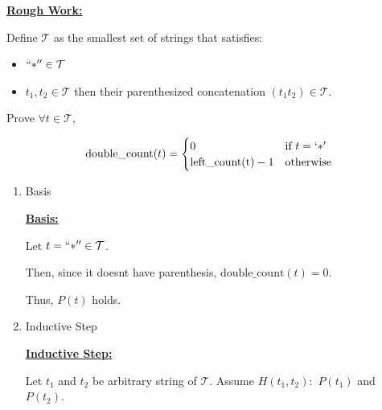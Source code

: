 \documentclass[12pt]{article}
\begin{document}
\begin{enumerate}[a.]
    \begin{mdframed}
    \underline{\textbf{Rough Work:}}

    \bigskip

    Define $\mathcal{T}$ as the smallest set of strings that satisfies:

    \begin{itemize}
        \item $``*'' \in \mathcal{T}$
        \item $t_1, t_2 \in \mathcal{T}$ then their parenthesized concatenation $(t_1t_2) \in \mathcal{T}$.
    \end{itemize}

    \bigskip

    Prove $\forall t \in \mathcal{T}$,

    \begin{align*}
        \text{double\_count}(t) =
        \begin{cases}
        0 & \text{if $t = `*'$}\\
        \text{left\_count(t)} - 1 & \text{otherwise}
        \end{cases}
    \end{align*}

    \begin{enumerate}[1.]
        \item Basis

        \begin{mdframed}
        \underline{\textbf{Basis:}}

        \bigskip

        Let $t = ``*'' \in \mathcal{T}$.

        \bigskip

        Then, since it doesnt have parenthesis, $\text{double\_count}(t) = 0$.

        \bigskip

        Thus, $P(t)$ holds.
        \end{mdframed}

        \item Inductive Step

        \begin{mdframed}
        \underline{\textbf{Inductive Step:}}

        \bigskip

        Let $t_1$ and $t_2$ be arbitrary string of $\mathcal{T}$. Assume $H(t_1,t_2):$
        $P(t_1)$ and $P(t_2)$.

        \bigskip


\end{mdframed}
\end{enumerate}
\end{mdframed}
\end{enumerate}
\end{document}
